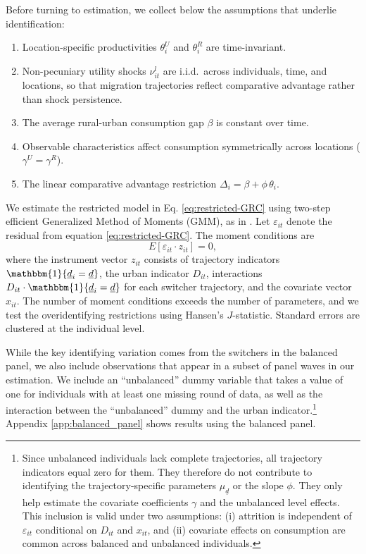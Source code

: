 \documentclass[12pt]{article}
\begin{document}
Before turning to estimation, we collect below the assumptions that underlie identification:
\begin{enumerate}[label=\textup{(A\arabic*)},leftmargin=*,itemsep=2pt]
    \item Location-specific productivities $\theta_i^U$ and $\theta_i^R$ are time-invariant.
    \item Non-pecuniary utility shocks $\nu_{it}^l$ are i.i.d.\ across individuals, time, and locations, so that migration trajectories reflect comparative advantage rather than shock persistence.
    \item The average rural-urban consumption gap $\beta$ is constant over time.
    \item Observable characteristics affect consumption symmetrically across locations ($\gamma^U = \gamma^R$).
    \item The linear comparative advantage restriction $\Delta_i = \beta + \phi\,\theta_i$.
\end{enumerate}

We estimate the restricted model in Eq. \eqref{eq:restricted-GRC} using two-step efficient Generalized Method of Moments (GMM), as in \cite{tjernstromCommentSuri2011}. 
Let $\varepsilon_{it}$ denote the residual from equation \eqref{eq:restricted-GRC}. The moment conditions are
\begin{equation}\label{eq:gmm-moments}
    E\!\left[\varepsilon_{it} \cdot z_{it}\right] = 0,
\end{equation}
where the instrument vector $z_{it}$ consists of trajectory indicators $\mathbbm{1}\{\underline{d}_i = \underline{d}\}$, the urban indicator $D_{it}$, interactions $D_{it} \cdot \mathbbm{1}\{\underline{d}_i = \underline{d}\}$ for each switcher trajectory, and the covariate vector $x_{it}$.
The number of moment conditions exceeds the number of parameters, and we test the overidentifying restrictions using Hansen's $J$-statistic.
Standard errors are clustered at the individual level.

While the key identifying variation comes from the switchers in the balanced panel, we also include observations that appear in a subset of panel waves in our estimation.
We include an ``unbalanced'' dummy variable that takes a value of one for individuals with at least one missing round of data, as well as the interaction between the ``unbalanced'' dummy and the urban indicator.\footnote{Since unbalanced individuals lack complete trajectories, all trajectory indicators equal zero for them. They therefore do not contribute to identifying the trajectory-specific parameters $\mu_{\underline{d}}$ or the slope $\phi$. They only help estimate the covariate coefficients $\gamma$ and the unbalanced level effects. This inclusion is valid under two assumptions: (i) attrition is independent of $\varepsilon_{it}$ conditional on $D_{it}$ and $x_{it}$, and (ii) covariate effects on consumption are common across balanced and unbalanced individuals.}
Appendix \ref{app:balanced_panel} shows results using the balanced panel.
\end{document}
